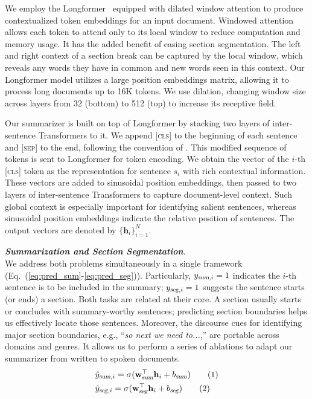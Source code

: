 \documentclass[11pt]{article}
\newcommand\numberthis{\addtocounter{equation}{1}\tag{\theequation}}
\begin{document}
We employ the Longformer~\cite{Beltagy:2020} equipped with dilated window attention to 
produce contextualized token embeddings for an input document.
Windowed attention allows each token to attend only to its local window 
to reduce computation and memory usage.
It has the added benefit of easing section segmentation.
The left and right context of a section break can be captured by the local window,
which reveals any words they have in common and new words seen in this context.
Our Longformer model utilizes a large position embeddings matrix, allowing it to process long documents up to 16K tokens.
We use dilation, changing window size across layers from 32 (bottom) to 512 (top)
to increase its receptive field.


Our summarizer is built on top of Longformer by stacking two layers of inter-sentence Transformers to it.
We append \textsc{[cls]} to the beginning of each sentence and \textsc{[sep]} to the end,
following the convention of \cite{liu-lapata-2019-text}.
This modified sequence of tokens is sent to Longformer for token encoding. We obtain the vector of the $i$-th \textsc{[cls]} token as the representation for sentence $s_i$ with rich contextual information.
These vectors are added to sinusoidal position embeddings, 
then passed to two layers of inter-sentence Transformers 
to capture document-level context.
Such global context is especially important for identifying salient sentences,
whereas sinusoidal position embeddings indicate the relative position of sentences.
The output vectors are denoted by $\{\mathbf{h}_{i}\}_{i=1}^N$.


\vspace{0.04in}
\noindent \textbf{\textsl{Summarization and Section Segmentation}}.\\
We address both problems simultaneously in a single framework (Eq.~(\ref{eq:pred_sum}-\ref{eq:pred_seg})). 
Particularly, $y_{\textsl{sum},i} = 1$ indicates the $i$-th sentence is to be included in the summary;
$y_{\textsl{seg},i} = 1$ suggests the sentence starts (or ends) a section.
Both tasks are related at their core.
A section usually starts or concludes with summary-worthy sentences;
predicting section boundaries helps us effectively locate those sentences.
Moreover, the discourse cues for identifying major section boundaries, e.g., ``\emph{so next we need to...},''
are portable across domains and genres.
It allows us to perform a series of ablations to adapt our summarizer from written to spoken documents.
\begin{align*}
& \hat{y}_{\textsl{sum},i} = \sigma ( \mathbf{w}^{\top}_{\textsl{sum}} \mathbf{h}_{i} + b_{\textsl{sum}} )
\numberthis\label{eq:pred_sum}\\
& \hat{y}_{\textsl{seg},i} = \sigma ( \mathbf{w}^{\top}_{\textsl{seg}} \mathbf{h}_{i} + b_{\textsl{seg}} )
\numberthis\label{eq:pred_seg}
\end{align*}
\end{document}
